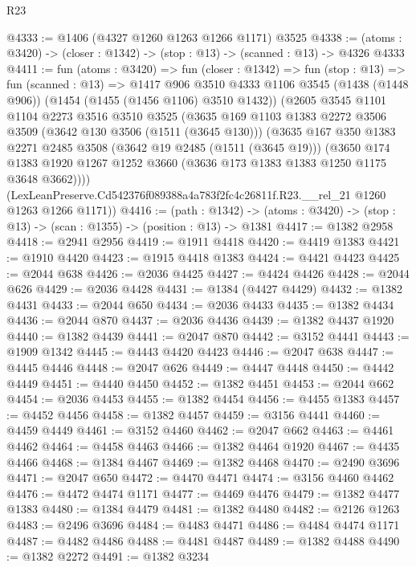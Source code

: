 \begin{lexlean}{R23}
\begin{coremodule}
@4333 := @1406 (@4327 @1260 @1263 @1266 @1171) @3525
@4338 := (atoms : @3420) -> (closer : @1342) -> (stop : @13) -> (scanned : @13) -> @4326 @4333
@4411 := fun (atoms : @3420) =>
  fun (closer : @1342) =>
  fun (stop : @13) =>
  fun (scanned : @13) =>
  @1417
    @906
    @3510
    @4333
    @1106
    @3545
    (@1438 (@1448 @906))
    (@1454 (@1455 (@1456 @1106) @3510 @1432))
    (@2605
      @3545
      @1101
      @1104
      @2273
      @3516
      @3510
      @3525
      (@3635
        @169
        @1103
        @1383
        @2272
        @3506
        @3509
        (@3642 @130 @3506 (@1511 (@3645 @130)))
        (@3635
          @167
          @350
          @1383
          @2271
          @2485
          @3508
          (@3642 @19 @2485 (@1511 (@3645 @19)))
          (@3650
            @174
            @1383
            @1920
            @1267
            @1252
            @3660
            (@3636 @173 @1383 @1383 @1250 @1175 @3648 @3662))))
      (LexLeanPreserve.Cd542376f089388a4a783f2fc4c26811f.R23.__rel_21 @1260 @1263 @1266 @1171))
@4416 := (path : @1342) ->
  (atoms : @3420) -> (stop : @13) -> (scan : @1355) -> (position : @13) -> @1381
@4417 := @1382 @2958
@4418 := @2941 @2956
@4419 := @1911 @4418
@4420 := @4419 @1383
@4421 := @1910 @4420
@4423 := @1915 @4418 @1383
@4424 := @4421 @4423
@4425 := @2044 @638
@4426 := @2036 @4425
@4427 := @4424 @4426
@4428 := @2044 @626
@4429 := @2036 @4428
@4431 := @1384 (@4427 @4429)
@4432 := @1382 @4431
@4433 := @2044 @650
@4434 := @2036 @4433
@4435 := @1382 @4434
@4436 := @2044 @870
@4437 := @2036 @4436
@4439 := @1382 @4437 @1920
@4440 := @1382 @4439
@4441 := @2047 @870
@4442 := @3152 @4441
@4443 := @1909 @1342
@4445 := @4443 @4420 @4423
@4446 := @2047 @638
@4447 := @4445 @4446
@4448 := @2047 @626
@4449 := @4447 @4448
@4450 := @4442 @4449
@4451 := @4440 @4450
@4452 := @1382 @4451
@4453 := @2044 @662
@4454 := @2036 @4453
@4455 := @1382 @4454
@4456 := @4455 @1383
@4457 := @4452 @4456
@4458 := @1382 @4457
@4459 := @3156 @4441
@4460 := @4459 @4449
@4461 := @3152 @4460
@4462 := @2047 @662
@4463 := @4461 @4462
@4464 := @4458 @4463
@4466 := @1382 @4464 @1920
@4467 := @4435 @4466
@4468 := @1384 @4467
@4469 := @1382 @4468
@4470 := @2490 @3696
@4471 := @2047 @650
@4472 := @4470 @4471
@4474 := @3156 @4460 @4462
@4476 := @4472 @4474 @1171
@4477 := @4469 @4476
@4479 := @1382 @4477 @1383
@4480 := @1384 @4479
@4481 := @1382 @4480
@4482 := @2126 @1263
@4483 := @2496 @3696
@4484 := @4483 @4471
@4486 := @4484 @4474 @1171
@4487 := @4482 @4486
@4488 := @4481 @4487
@4489 := @1382 @4488
@4490 := @1382 @2272
@4491 := @1382 @3234

\end{coremodule}
\end{lexlean}
